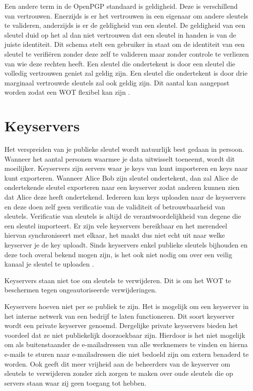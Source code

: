 Een andere term in de \gls{OpenPGP} standaard is geldigheid. Deze is verschillend van
vertrouwen. Enerzijds is er het vertrouwen in een eigenaar om andere sleutels te
valideren, anderzijds is er de geldigheid van een sleutel. De geldigheid van een
sleutel duid op het al dan niet vertrouwen dat een sleutel in handen is van de
juiste identiteit.
Dit schema stelt een gebruiker in staat om de identiteit van een sleutel te
verifiëren zonder deze zelf te valideren maar zonder controle te verliezen van
wie deze rechten heeft. Een sleutel die ondertekent is door een sleutel die
volledig vertrouwen geniet zal geldig zijn. Een sleutel die ondertekent is door
drie marginaal vertrouwde sleutels zal ook geldig zijn. Dit aantal kan aangepast
worden zodat een WOT flexibel kan zijn \autocite{GNUManualValidatingKeys}.

\section{Keyservers}
\label{sec:keyservers}

Het verspreiden van je publieke sleutel wordt natuurlijk best gedaan in persoon.
Wanneer het aantal personen waarmee je data uitwisselt toeneemt, wordt dit
moeilijker. Keyservers zijn servers waar je keys van kunt importeren en keys
naar kunt exporteren. Wanneer Alice Bob zijn sleutel ondertekent, dan zal Alice
de ondertekende sleutel exporteren naar een keyserver zodat anderen kunnen zien
dat Alice deze heeft ondertekend. Iedereen kan keys uploaden naar de keyservers
en deze doen zelf geen verificatie van de validiteit of betrouwbaarheid van
sleutels. Verificatie van sleutels is altijd de verantwoordelijkheid van degene
die een sleutel importeert. Er zijn vele keyservers bereikbaar en het merendeel
hiervan synchroniseert met elkaar, het maakt dus niet echt uit naar welke
keyserver je de key uploadt. Sinds keyservers enkel publieke sleutels bijhouden
en deze toch overal bekend mogen zijn, is het ook niet nodig om over een veilig
kanaal je sleutel te uploaden \autocite{GNUManualDistributingKeys}.

Keyservers staan niet toe om sleutels te verwijderen. Dit is om het WOT te
beschermen tegen ongeautoriseerde verwijderingen.

Keyservers hoeven niet per se publiek te zijn. Het is mogelijk om een keyserver
in het interne netwerk van een bedrijf te laten functioneren. Dit soort
keyserver wordt een private keyserver genoemd. Dergelijke private keyservers
bieden het voordeel dat ze niet publiekelijk doorzoekbaar zijn. Hierdoor is het
niet mogelijk om als buitenstaander de e-mailadressen van alle werknemers te
vinden en hierna e-mails te sturen naar e-mailadressen die niet bedoeld zijn om
extern benaderd te worden. Ook geeft dit meer vrijheid aan de beheerders van de
keyserver om sleutels te verwijderen zonder zich zorgen te maken over oude
sleutels die op servers staan waar zij geen toegang tot hebben.

